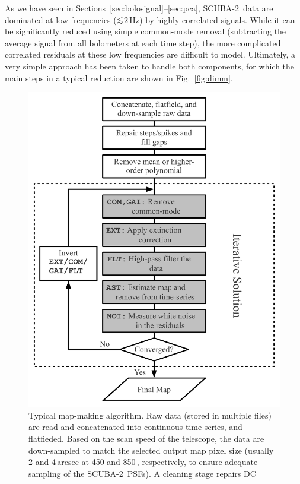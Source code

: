 \documentclass[useAMS,usenatbib,nofootinbib]{mn2e}
\newcommand{\scuba}{SCUBA-2}
\def\lsim{\mathrel{\lower2.5pt\vbox{\lineskip=0pt\baselineskip=0pt
          \hbox{$<$}\hbox{$\sim$}}}}
\begin{document}
As we have seen in Sections~\ref{sec:bolosignal}--\ref{sec:pca},
\scuba\ data are dominated at low frequencies ($\lsim$2\,Hz) by highly
correlated signals. While it can be significantly reduced using simple
common-mode removal (subtracting the average signal from all
bolometers at each time step), the more complicated correlated
residuals at these low frequencies are difficult to model. Ultimately,
a very simple approach has been taken to handle both components, for
which the main steps in a typical reduction are shown in
Fig.~\ref{fig:dimm}.

\begin{figure}
\centering
\includegraphics[width=\linewidth]{dimm.pdf}
\caption{Typical map-making algorithm. Raw data (stored in multiple
  files) are read and concatenated into continuous time-series, and
  flatfieded. Based on the scan speed of the telescope, the data are
  down-sampled to match the selected output map pixel size (usually 2
  and 4\,arcsec at 450 and 850\,\micron, respectively, to ensure
  adequate sampling of the \scuba\ PSFs). A cleaning stage repairs DC
}
\end{figure}
\end{document}
